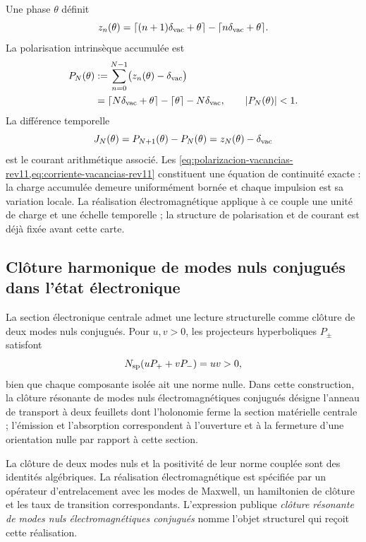 Une phase \(\theta\) définit
\[
 z_n(\theta)=\lceil(n+1)\delta_{\rm vac}+\theta\rceil
 -\lceil n\delta_{\rm vac}+\theta\rceil.
\]
La polarisation intrinsèque accumulée est
\begin{equation}
 \begin{aligned}
 P_N(\theta)
 &:=\sum_{n=0}^{N-1}\bigl(z_n(\theta)-\delta_{\rm vac}\bigr)\\
 &=\lceil N\delta_{\rm vac}+\theta\rceil-
   \lceil\theta\rceil-N\delta_{\rm vac},
 \qquad |P_N(\theta)|<1.
 \end{aligned}
 \label{eq:polarizacion-vacancias-rev11}
\end{equation}
La différence temporelle
\begin{equation}
 J_N(\theta)=P_{N+1}(\theta)-P_N(\theta)
 =z_N(\theta)-\delta_{\rm vac}
 \label{eq:corriente-vacancias-rev11}
\end{equation}
est le courant arithmétique associé. Les
\cref{eq:polarizacion-vacancias-rev11,eq:corriente-vacancias-rev11}
constituent une équation de continuité exacte : la charge accumulée demeure
uniformément bornée et chaque impulsion est sa variation locale. La réalisation
électromagnétique applique à ce couple une unité de charge et une échelle temporelle ;
la structure de polarisation et de courant est déjà fixée avant cette carte.

\subsection{Clôture harmonique de modes nuls conjugués dans l'état électronique}
\label{sec:nido-armonico-modos-nulos-rev11}

La section électronique centrale admet une lecture structurelle comme clôture
de deux modes nuls conjugués. Pour \(u,v>0\), les projecteurs hyperboliques
\(P_\pm\) satisfont
\[
 N_{\rm sp}(uP_++vP_-)=uv>0,
\]
bien que chaque composante isolée ait une norme nulle. Dans cette construction, la
clôture résonante de modes nuls électromagnétiques conjugués désigne l'anneau
de transport à deux feuillets dont l'holonomie ferme la section matérielle
centrale ; l'émission et l'absorption correspondent à l'ouverture et à la fermeture d'une
orientation nulle par rapport à cette section.

\begin{statusbox}[title={Réalisation photonique de la clôture harmonique}]
La clôture de deux modes nuls et la positivité de leur norme couplée sont des
identités algébriques. La réalisation électromagnétique est spécifiée par
un opérateur d'entrelacement avec les modes de Maxwell, un hamiltonien de clôture et les
taux de transition correspondants. L'expression publique
\emph{clôture résonante de modes nuls électromagnétiques conjugués}
nomme l'objet structurel qui reçoit cette réalisation.
\end{statusbox}
